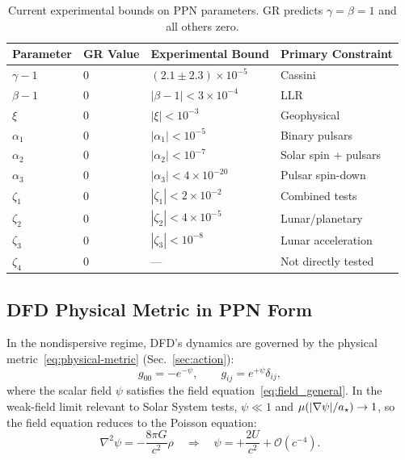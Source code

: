 \begin{table}[t]
\centering
\footnotesize
\caption{Current experimental bounds on PPN parameters. GR predicts $\gamma = \beta = 1$ and all others zero.}\label{tab:ppn-bounds}
\renewcommand{\arraystretch}{1.2}
\begin{tabular}{llll}
\toprule
Parameter & GR Value & Experimental Bound & Primary Constraint \\
\midrule
$\gamma - 1$ & 0 & $(2.1 \pm 2.3) \times 10^{-5}$ & Cassini \cite{Bertotti2003} \\
$\beta - 1$ & 0 & $|\beta - 1| < 3 \times 10^{-4}$ & LLR \cite{Williams2004} \\
$\xi$ & 0 & $|\xi| < 10^{-3}$ & Geophysical \\
$\alpha_1$ & 0 & $|\alpha_1| < 10^{-5}$ & Binary pulsars \cite{Shao2014} \\
$\alpha_2$ & 0 & $|\alpha_2| < 10^{-7}$ & Solar spin + pulsars \cite{Shao2014} \\
$\alpha_3$ & 0 & $|\alpha_3| < 4 \times 10^{-20}$ & Pulsar spin-down \cite{Will2018} \\
$\zeta_1$ & 0 & $|\zeta_1| < 2 \times 10^{-2}$ & Combined tests \\
$\zeta_2$ & 0 & $|\zeta_2| < 4 \times 10^{-5}$ & Lunar/planetary \\
$\zeta_3$ & 0 & $|\zeta_3| < 10^{-8}$ & Lunar acceleration \\
$\zeta_4$ & 0 & --- & Not directly tested \\
\bottomrule
\end{tabular}
\end{table}

\subsection{DFD Physical Metric in PPN Form}\label{sec:ppn-dfd-metric}

In the nondispersive regime, DFD's dynamics are governed by the physical metric~\eqref{eq:physical-metric} (Sec.~\ref{sec:action}):
\begin{equation}\label{eq:dfd-optical-ppn}
g_{00} = -e^{-\psi}, \qquad g_{ij} = e^{+\psi}\delta_{ij},
\end{equation}
where the scalar field $\psi$ satisfies the field equation~\eqref{eq:field_general}. In the weak-field limit relevant to Solar System tests, $\psi \ll 1$ and $\mu(|\nabla\psi|/a_\star) \to 1$, so the field equation reduces to the Poisson equation:
\begin{equation}
\nabla^2 \psi = -\frac{8\pi G}{c^2}\rho \quad \Rightarrow \quad \psi = +\frac{2U}{c^2} + \mathcal{O}(c^{-4}).
\end{equation}

